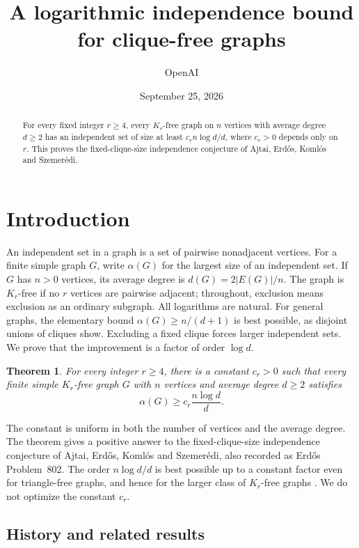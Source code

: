 \documentclass[11pt]{article}
\title{A logarithmic independence bound for clique-free graphs}
\author{OpenAI}
\date{September 25, 2026}
\newtheorem{theorem}{Theorem}[section]
\theoremstyle{definition}
\theoremstyle{remark}
\numberwithin{equation}{section}
\begin{document}
\maketitle
\begin{abstract}
For every fixed integer $r\ge4$, every $K_r$-free graph on $n$ vertices
with average degree $d\ge2$ has an independent set of size at least
$c_r n\log d/d$, where $c_r>0$ depends only on $r$.
This proves the fixed-clique-size independence conjecture of Ajtai,
Erd\H{o}s, Koml\'os and Szemer\'edi.
\end{abstract}
\setcounter{tocdepth}{1}
\tableofcontents
\clearpage
\section{Introduction}
\label{sec:introduction}

An independent set in a graph is a set of pairwise nonadjacent vertices.
For a finite simple graph $G$, write $\alpha(G)$ for the largest size of
an independent set. If $G$ has $n>0$ vertices, its average degree is
$d(G)=2|E(G)|/n$. The graph is $K_r$-free if no $r$ vertices are pairwise
adjacent; throughout, exclusion means exclusion as an ordinary subgraph.
All logarithms are natural. For general graphs, the elementary bound
$\alpha(G)\ge n/(d+1)$ is best possible, as disjoint unions of cliques
show. Excluding a fixed clique forces larger independent sets. We prove
that the improvement is a factor of order $\log d$.

\begin{theorem}\label{thm:main}
For every integer $r\ge4$, there is a constant $c_r>0$ such that every
finite simple $K_r$-free graph $G$ with $n$ vertices and average degree $d\ge2$
satisfies
\[
 \alpha(G)\ge c_r\frac{n\log d}{d}.
\]
\end{theorem}

The constant is uniform in both the number of vertices and the average
degree. The theorem gives a positive answer to the fixed-clique-size
independence conjecture of Ajtai, Erd\H{o}s, Koml\'os and Szemer\'edi,
also recorded as Erd\H{o}s Problem~802. The order $n\log d/d$ is best
possible up to a constant factor even for triangle-free graphs, and
hence for the larger class of $K_r$-free graphs
\cite[pp.~314--315]{AEKS1981}. We do not optimize the constant $c_r$.

\subsection{History and related results}
\end{document}
